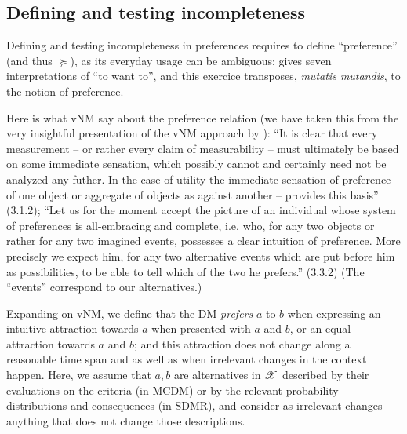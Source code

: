 \documentclass[version=last, pagesize, twocolumn, twoside=off, bibliography=totoc, 12pt, a4paper, english]{scrartcl}
\begin{document}
\subsection{Defining and testing incompleteness}
\label{sec:empirical}
Defining and testing incompleteness in preferences requires to define “preference” (and thus $\succeq$), as its everyday usage can be ambiguous: \citet{frankfurt_freedom_1971} gives seven interpretations of “to want to”, and this exercice transposes, \emph{mutatis mutandis}, to the notion of preference.
	
	
Here is what vNM say about the preference relation (we have taken this from the very insightful presentation of the vNM approach by \citet{fishburn_retrospective_1989}):
“It is clear that every measurement – or rather every claim of measurability – must ultimately be based on some immediate sensation, 
which possibly cannot and certainly need not be analyzed any futher.
In the case of utility the immediate sensation of preference – of one object or aggregate of objects as against another – 
provides this basis” (3.1.2);
“Let us for the moment accept the picture of an individual whose system of preferences is all-embracing and complete, i.e. who, for any two objects or rather for any two imagined events, possesses a clear intuition of preference. More precisely
 we expect him, for any two alternative events which are put before him as possibilities, to be able to tell which of the two he prefers.” (3.3.2) (The “events” correspond to our alternatives.)
	
Expanding on vNM, we define that the \ac{DM} \emph{prefers} $a$ to $b$ when expressing an intuitive attraction towards $a$ when presented with $a$ and $b$, or an equal attraction towards $a$ and $b$; and this attraction does not change along a reasonable time span and as well as when irrelevant changes in the context happen. %
Here, we assume that $a, b$ are alternatives in $\mathscr{X}$ described by their evaluations on the criteria (in MCDM) or by the relevant probability distributions and consequences (in SDMR), and consider as irrelevant changes anything that does not change those descriptions. 
\end{document}
